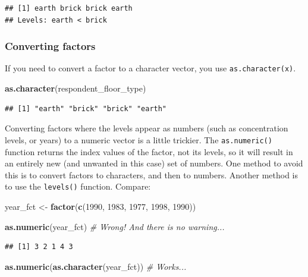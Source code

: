 \documentclass[
]{article}
\newenvironment{Shaded}{\begin{snugshade}}{\end{snugshade}}
\newcommand{\CommentTok}[1]{\textcolor[rgb]{0.56,0.35,0.01}{\textit{#1}}}
\newcommand{\DecValTok}[1]{\textcolor[rgb]{0.00,0.00,0.81}{#1}}
\newcommand{\FunctionTok}[1]{\textcolor[rgb]{0.13,0.29,0.53}{\textbf{#1}}}
\newcommand{\NormalTok}[1]{#1}
\newcommand{\OtherTok}[1]{\textcolor[rgb]{0.56,0.35,0.01}{#1}}
\begin{document}
\begin{verbatim}
## [1] earth brick brick earth
## Levels: earth < brick
\end{verbatim}

\subsubsection{Converting factors}\label{converting-factors}

If you need to convert a factor to a character vector, you use
\texttt{as.character(x)}.

\begin{Shaded}
\begin{Highlighting}[]
\FunctionTok{as.character}\NormalTok{(respondent\_floor\_type)}
\end{Highlighting}
\end{Shaded}

\begin{verbatim}
## [1] "earth" "brick" "brick" "earth"
\end{verbatim}

Converting factors where the levels appear as numbers (such as
concentration levels, or years) to a numeric vector is a little
trickier. The \texttt{as.numeric()} function returns the index values of
the factor, not its levels, so it will result in an entirely new (and
unwanted in this case) set of numbers. One method to avoid this is to
convert factors to characters, and then to numbers. Another method is to
use the \texttt{levels()} function. Compare:

\begin{Shaded}
\begin{Highlighting}[]
\NormalTok{year\_fct }\OtherTok{\textless{}{-}} \FunctionTok{factor}\NormalTok{(}\FunctionTok{c}\NormalTok{(}\DecValTok{1990}\NormalTok{, }\DecValTok{1983}\NormalTok{, }\DecValTok{1977}\NormalTok{, }\DecValTok{1998}\NormalTok{, }\DecValTok{1990}\NormalTok{))}

\FunctionTok{as.numeric}\NormalTok{(year\_fct)                     }\CommentTok{\# Wrong! And there is no warning...}
\end{Highlighting}
\end{Shaded}

\begin{verbatim}
## [1] 3 2 1 4 3
\end{verbatim}

\begin{Shaded}
\begin{Highlighting}[]
\FunctionTok{as.numeric}\NormalTok{(}\FunctionTok{as.character}\NormalTok{(year\_fct))       }\CommentTok{\# Works...}
\end{Highlighting}
\end{Shaded}
\end{document}
